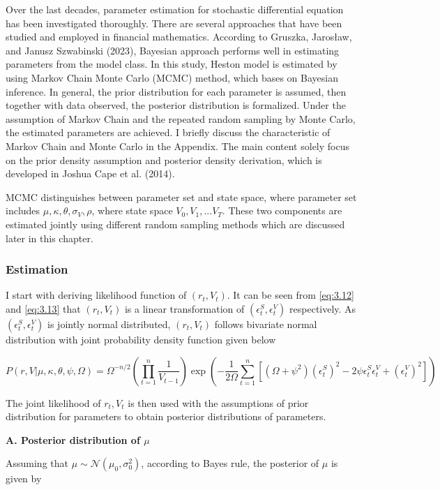 \documentclass[12pt,a4paper]{article}
\numberwithin{equation}{section}
\begin{document}
Over the last decades, parameter estimation for stochastic differential equation has been investigated thoroughly. There are several approaches that have been studied and employed in financial mathematics. According to Gruszka, Jarosław, and Janusz Szwabinski (2023), Bayesian approach performs well in estimating parameters from the model class. In this study, Heston model is estimated by using Markov Chain Monte Carlo (MCMC) method, which bases on Bayesian inference. In general, the prior distribution for each parameter is assumed, then together with data observed, the posterior distribution is formalized. Under the assumption of Markov Chain and the repeated random sampling by Monte Carlo, the estimated parameters are achieved. I briefly discuss the characteristic of Markov Chain and Monte Carlo in the Appendix. The main content solely focus on the prior density assumption and posterior density derivation, which is developed in Joshua Cape et al. (2014).

MCMC distinguishes between parameter set and state space, where parameter set includes $\mu, \kappa, \theta, \sigma_V, \rho$, where state space ${V_0, V_1, ...V_T}$. These two components are estimated jointly using different random sampling methods which are discussed later in this chapter.

\subsubsection{Estimation}
I start with deriving likelihood function of $(r_t, V_t)$. It can be seen from \eqref{eq:3.12} and  \eqref{eq:3.13} that $(r_t, V_t)$ is a linear transformation of $(\epsilon_t^S, \epsilon_t^V)$ respectively. As $(\epsilon_t^S, \epsilon_t^V)$ is jointly normal distributed, $(r_t, V_t)$ follows bivariate normal distribution with joint probability density function given below

\[
P(r, V| \mu, \kappa, \theta, \psi, \Omega) = \Omega^{-n/2} \left( \prod_{t=1}^{n} \frac{1}{V_{t-1}}\right) \exp \left(- \frac{1}{2\Omega} \sum_{t=1}^{n} [(\Omega + \psi^2)(\epsilon_t^S)^2 - 2 \psi \epsilon_t^S \epsilon_t^V + (\epsilon_t^V)^2]\right) \label{eq:3.13}
\]

The joint likelihood of $r_t, V_t$ is then used with the assumptions of prior distribution for parameters to obtain posterior distributions of parameters.

\textbf{A. Posterior distribution of $\mu$}

Assuming that $\mu \sim \mathcal{N}(\mu_0, \sigma_0^2)$, according to Bayes rule, the posterior of $\mu$ is given by
\end{document}
